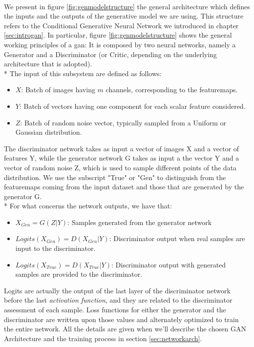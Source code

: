 \paragraph{} We present in figure \ref{fig:genmodelstructure} the general architecture which defines the inputs and the outputs of the generative model we are using. This structure refers to the Conditional Generative Neural Network we introduced in chapter \ref{sec:introgan}. In particular, figure \ref{fig:genmodelstructure} shows the general working principles of a \gls{gan}: It is composed by two neural networks, namely a Generator and a Discriminator (or Critic, depending on the underlying architecture that is adopted). \\* The input of this subsystem are defined as follows:
\begin{itemize}
	\item $X$: Batch of images having $m$ channels, corresponding to the \glspl{featuremap}.
	\item $Y$: Batch of vectors having one component for each scalar feature considered.
	\item $Z$: Batch of random noise vector, typically sampled from a Uniform or Gaussian distribution.
\end{itemize}

The discriminator network takes as input a vector of images X and a vector of features Y, while the generator network G takes as input a the vector  Y and a vector of random noise Z, which is used to sample different points of the data distribution. We use the subscript "True" or "Gen" to distinguish from the \glspl{featuremap} coming from the input dataset and those that are generated by the generator G.
\\* For what concerns the network outputs, we have that:
\begin{itemize}
	\item  $ X_{Gen} = G(Z|Y) $: Samples generated from the generator network
	\item  $ Logits(X_{Gen}) = D(X_{Gen}|Y) $: Discriminator output when real samples are input to the discriminator.
	\item  $ Logits(X_{True}) = D(X_{True}|Y) $: Discriminator output with generated samples are provided to the discriminator.
\end{itemize}	
Logits are actually the output of the last layer of the discriminator network before the last \textit{activation function}, and they are related to the discriminator assessment of each sample. Loss functions for either the generator and the discriminator are written upon those values and alternately optimized to train the entire network. All the details are given when we'll describe the chosen GAN Architecture and the training process in section \ref{sec:networkarch}.

